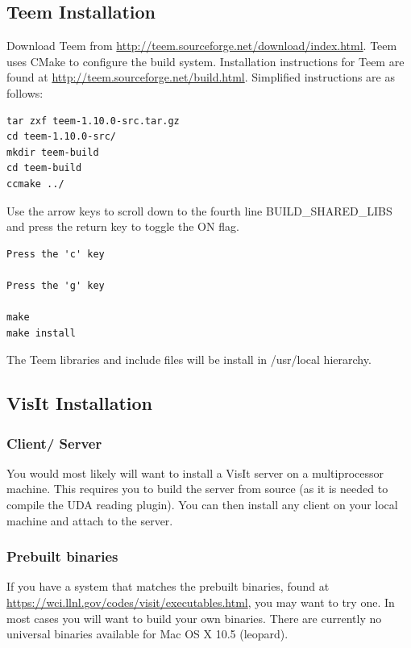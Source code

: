 \documentclass[12pt]{article}
\begin{document}
\subsection{Teem Installation}
\label{subsec:teem}


Download Teem from
\url{http://teem.sourceforge.net/download/index.html}.  Teem uses
CMake to configure the build system. Installation instructions for
Teem are found at \url{http://teem.sourceforge.net/build.html}.  Simplified
instructions are as follows:

\begin{verbatim}
tar zxf teem-1.10.0-src.tar.gz
cd teem-1.10.0-src/
mkdir teem-build
cd teem-build
ccmake ../
\end{verbatim}

Use the arrow keys to scroll down to the fourth line
BUILD\_SHARED\_LIBS and press the return key to toggle the ON flag.

\begin{verbatim}
Press the 'c' key

Press the 'g' key

make
make install
\end{verbatim}
The Teem libraries and include files will be install in /usr/local hierarchy.

\subsection{VisIt Installation}

\subsubsection{Client/ Server}
\label{subsec:ClientServer}

You would most likely will want to install a VisIt server on a
multiprocessor machine. This requires you to build the server from
source (as it is needed to compile the UDA reading plugin). You can
then install any client on your local machine and attach to the
server.

\subsubsection{Prebuilt binaries}
\label{subsec:PrebuiltBinaries}

If you have a system that matches the prebuilt binaries, found at
\url{https://wci.llnl.gov/codes/visit/executables.html}, you may want
to try one. In most cases you will want to build your own
binaries. There are currently no universal binaries available for Mac
OS X 10.5 (leopard).
\end{document}
